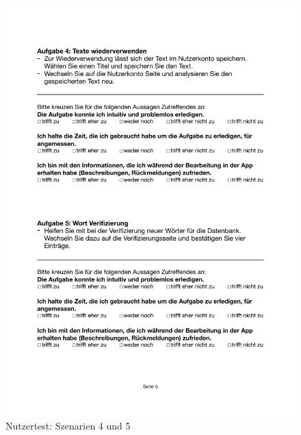 \begin{figure}[h]
	\centering
	\includegraphics[width=.95\linewidth, frame]{figures/evaluation/test45}
	\caption{Nutzertest: Szenarien 4 und 5}
	\label{fig:evaluation-test45}
\end{figure}
\newpage

